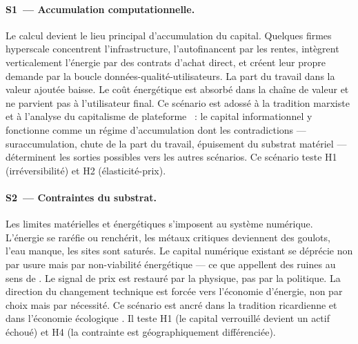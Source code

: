 \paragraph{S1~--- Accumulation computationnelle.}
Le calcul devient le lieu principal d'accumulation du capital. Quelques firmes hyperscale concentrent l'infrastructure, l'autofinancent par les rentes, int\`egrent verticalement l'\'energie par des contrats d'achat direct, et cr\'eent leur propre demande par la boucle donn\'ees-qualit\'e-utilisateurs. La part du travail dans la valeur ajout\'ee baisse. Le co\^ut \'energ\'etique est absorb\'e dans la cha\^ine de valeur et ne parvient pas \`a l'utilisateur final. Ce sc\'enario est adoss\'e \`a la tradition marxiste et \`a l'analyse du capitalisme de plateforme \parencite{durand_techno-feodalisme_2020}~: le capital informationnel y fonctionne comme un r\'egime d'accumulation dont les contradictions --- suraccumulation, chute de la part du travail, \'epuisement du substrat mat\'eriel --- d\'eterminent les sorties possibles vers les autres sc\'enarios. Ce sc\'enario teste H1 (irr\'eversibilit\'e) et H2 (\'elasticit\'e-prix).

\paragraph{S2~--- Contraintes du substrat.}
Les limites mat\'erielles et \'energ\'etiques s'imposent au syst\`eme num\'erique. L'\'energie se rar\'efie ou rench\'erit, les m\'etaux critiques deviennent des goulots, l'eau manque, les sites sont satur\'es. Le capital num\'erique existant se d\'epr\'ecie non par usure mais par non-viabilit\'e \'energ\'etique --- ce que \textcite{deron_sprouting_2025} appellent des \og ruines\fg{} au sens de \textcite{monnin_communs_2021}. Le signal de prix est restaur\'e par la physique, pas par la politique. La direction du changement technique est forc\'ee vers l'\'economie d'\'energie, non par choix mais par n\'ecessit\'e. Ce sc\'enario est ancr\'e dans la tradition ricardienne et dans l'\'economie \'ecologique \parencite{georgescu-roegen_entropy_1971}. Il teste H1 (le capital verrouill\'e devient un actif \'echou\'e) et H4 (la contrainte est g\'eographiquement diff\'erenci\'ee).

